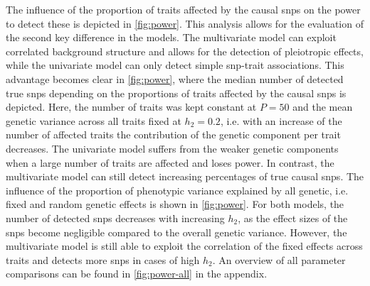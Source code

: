 The influence of the proportion of traits affected by the causal \glspl{snp} on the power to detect these is depicted in \cref{fig:power}. This analysis allows for the evaluation of the second key difference in the models. The multivariate model can exploit correlated background structure and allows for the detection of pleiotropic effects, while the univariate model can only detect simple \gls{snp}-trait associations. This advantage becomes clear in \cref{fig:power}, where the median number of detected true \glspl{snp} depending on the proportions of traits affected by the causal \glspl{snp} is depicted. Here, the number of traits was kept constant at \(P=50\) and the mean genetic variance across all traits fixed at \(h_2=0.2\), i.e. with an increase of the number of affected traits the contribution of the genetic component per trait decreases. The univariate model suffers from the weaker genetic components when a large number of traits are affected and loses power. In contrast, the multivariate model can still detect increasing percentages of true causal \glspl{snp}. The influence of the proportion of phenotypic variance explained by all genetic, i.e. fixed and random genetic effects is shown in \cref{fig:power}. For both models, the number of detected \glspl{snp} decreases with increasing \(h_2\), as the effect sizes of the \glspl{snp} become negligible compared to the overall genetic variance. However, the multivariate model is still able to exploit the correlation of the fixed effects across traits and detects more \glspl{snp} in cases of high \(h_2\). An overview of all parameter comparisons can be found in \cref{fig:power-all} in the appendix. 
 